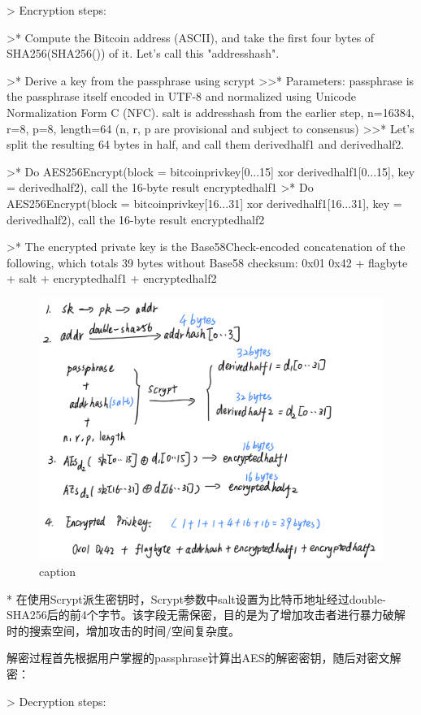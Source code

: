 \documentclass{article}
\begin{document}
> Encryption steps:

>* Compute the Bitcoin address (ASCII), and take the first four bytes of SHA256(SHA256()) of it. Let's call this "addresshash".

>* Derive a key from the passphrase using scrypt  
>>* Parameters: passphrase is the passphrase itself encoded in UTF-8 and normalized using Unicode Normalization Form C (NFC). salt is addresshash from the earlier step, n=16384, r=8, p=8, length=64 (n, r, p are provisional and subject to consensus)  
>>* Let's split the resulting 64 bytes in half, and call them derivedhalf1 and derivedhalf2.  

>* Do AES256Encrypt(block = bitcoinprivkey[0...15] xor derivedhalf1[0...15], key = derivedhalf2), call the 16-byte result encryptedhalf1  
>* Do AES256Encrypt(block = bitcoinprivkey[16...31] xor derivedhalf1[16...31], key = derivedhalf2), call the 16-byte result encryptedhalf2  

>* The encrypted private key is the Base58Check-encoded concatenation of the following, which totals 39 bytes without Base58 checksum:
0x01 0x42 + flagbyte + salt + encryptedhalf1 + encryptedhalf2

\begin{figure}[h]
\centering
\includegraphics[width=.7\textwidth]{./no-ec.png}
\caption{caption}\label{fig-parsesig}
\end{figure}


* 在使用Scrypt派生密钥时，Scrypt参数中salt设置为比特币地址经过double-SHA256后的前4个字节。该字段无需保密，目的是为了增加攻击者进行暴力破解时的搜索空间，增加攻击的时间/空间复杂度。



 解密过程首先根据用户掌握的passphrase计算出AES的解密密钥，随后对密文解密：

> Decryption steps:
\end{document}
